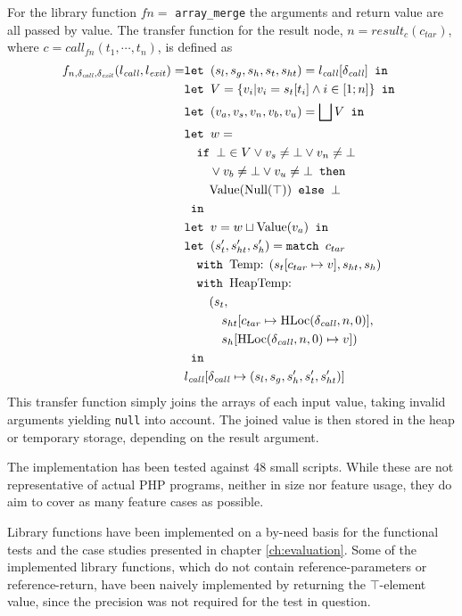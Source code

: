 For the library function $fn = $ \texttt{array\_merge} the arguments and return value are all passed by value. The transfer function for the result node, $n = \mathit{result}_{c}(c_{\mathit{tar}})$, where $c = \mathit{call}_{{fn}}(t_1,\cdots, t_n)$, is defined as 
\begin{align*}
f_{n,\delta_{\mathit{call}},\delta_{\mathit{exit}}}(l_{\mathit{call}}, l_{\mathit{exit}}) = 	&\texttt{let } (s_l, s_g, s_h, s_t, s_{ht}) = l_{\mathit{call}}[\delta_{\mathit{call}}] \texttt{ in }\notag\\
																							&\texttt{let } V =  \{v_i| v_i = s_t[t_i]\wedge i \in [1;n]\} \texttt{ in }\notag\\
																							&\texttt{let } (v_a,v_s, v_n, v_b, v_u) = \bigsqcup V \texttt{ in }\notag\\
																							&\texttt{let } w =  \notag\\
																							&\quad\texttt{if }\bot \in V \vee v_s \neq \bot \vee v_n \neq \bot\notag\\
																							&\quad\quad \vee v_b \neq \bot \vee v_u \neq \bot\texttt{ then } \notag\\
																							&\quad\quad\text{Value}(\text{Null}(\top)) \texttt{ else } \bot\notag\\
																							& \texttt{ in }\notag\\
																							&\texttt{let } v = w \sqcup \text{Value}(v_a) \texttt{ in }\notag\\
																							&\texttt{let } (s_t', s_{ht}',s_h') = \texttt{match }c_{tar}\notag\\
																							&\quad\texttt{with }\text{Temp}\text{: } (s_t[c_{tar}\mapsto v], s_{ht}, s_h)\notag\\
																							&\quad\texttt{with }\text{HeapTemp}\text{: }\notag\\
																							&\quad\quad(s_t, \notag\\
																							&\quad\quad\quad s_{ht}[c_{tar}\mapsto \text{HLoc}(\delta_{\mathit{call}}, n, 0)], \notag\\
																							&\quad\quad\quad s_h[\text{HLoc}(\delta_{\mathit{call}}, n, 0)\mapsto v])\notag\\
																							& \texttt{ in }\notag\\
																							&l_{\mathit{call}}[\delta_{\mathit{call}}\mapsto (s_l, s_g, s_h', s_t', s_{ht}')]
\end{align*} 
This transfer function simply joins the arrays of each input value, taking invalid arguments yielding \texttt{null} into account. The joined value is then stored in the heap or temporary storage, depending on the result argument.

The implementation has been tested against 48 small scripts. While these are not representative of actual PHP programs, neither in size nor feature usage, they do aim to cover as many feature cases as possible.

Library functions have been implemented on a by-need basis for the functional tests and the case studies presented in chapter \ref{ch:evaluation}. Some of the implemented library functions, which do not contain reference-parameters or reference-return, have been naively implemented by returning the $\top$-element value, since the precision was not required for the test in question.
